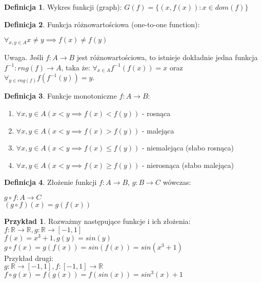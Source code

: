 \documentclass{article}
\theoremstyle{definition}
\newtheorem{de}{Definicja}[subsection]
\theoremstyle{definition}
\theoremstyle{definition}
\newtheorem{pk}{Przykład}[subsection]
\theoremstyle{definition}
\begin{document}
\begin{de}
    Wykres funkcji (graph): $G(f) = \{(x,f(x)): x\in dom(f)\}$
\end{de}

\begin{de}
    Funkcja różnowartościowa (one-to-one function):
    \begin{center}
         $\forall_{x,y\in A} x\neq y \implies f(x)\neq f(y)$
    \end{center}
    Uwaga. Jeśli $f: A\rightarrow B$ jest różnowartościowa, to istnieje dokładnie jedna funkcja\\ $f^{-1}: rng(f)\rightarrow A$, taka że:
    $\forall_{x\in A} f^{-1}(f(x))=x$ oraz $\forall_{y\in rng(f)} f(f^{-1}(y))=y$.
\end{de}

\begin{de}
    Funkcje monotoniczne $f: A\rightarrow B$:
    \begin{enumerate}
        \item $\forall{x,y\in A} (x<y \implies f(x)<f(y))$ - rosnąca
        \item $\forall{x,y\in A} (x<y \implies f(x)>f(y))$ - malejąca
        \item $\forall{x,y\in A} (x<y \implies f(x)\leq f(y))$ - niemalejąca (słabo rosnąca)
        \item $\forall{x,y\in A} (x<y \implies f(x)\geq f(y))$ - nierosnąca (słabo malejąca)
    \end{enumerate}
\end{de}

\begin{de}
    Złożenie funkcji $f: A\rightarrow B$, $g: B\rightarrow C$ wówczas:
    \begin{center}
    $g\circ f: A\rightarrow C$\\
    $(g\circ f)(x)=g(f(x))$
    \end{center}
\end{de}

\begin{pk}
    Rozważmy następujące funkcje i ich złożenia:\\
    $f: \mathbb{R}\rightarrow\mathbb{R}, g: \mathbb{R}\rightarrow[-1,1]$\\
    $f(x) = x^3 + 1, g(y) = sin(y)$\\
    $g\circ f(x) = g(f(x)) = sin(f(x)) = sin(x^3+1)$\\
    Przykład drugi:\\
    $g: \mathbb{R}\rightarrow[-1,1], f: [-1,1]\rightarrow\mathbb{R}$\\
    $f\circ g(x) = f(g(x)) = f(sin(x)) = sin^3(x)+1$
\end{pk}
\end{document}
